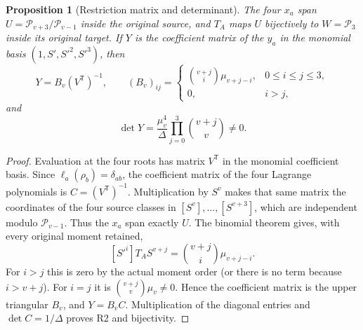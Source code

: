 \documentclass[11pt]{article}
\newtheorem{proposition}{Proposition}
\newcommand{\cP}{\mathcal P}
\begin{document}
\begin{proposition}[Restriction matrix and determinant]
The four $x_a$ span $U=\cP_{v+3}/\cP_{v-1}$ inside the original
source, and $T_A$ maps $U$ bijectively to $W=\cP_3$ inside its
original target. If $Y$ is the coefficient matrix of the $y_a$ in
the monomial basis $(1,S',S'^2,S'^3)$, then
\begin{equation}
 Y=B_v(V^{\mathsf T})^{-1},\qquad
 (B_v)_{ij}=\begin{cases}
 \binom{v+j}{i}\mu_{v+j-i},&0\le i\le j\le3,\\
 0,&i>j,
 \end{cases}\tag{R1}
\end{equation}
and
\begin{equation}
 \det Y=\frac{\mu_v^4}{\Delta}
             \prod_{j=0}^3\binom{v+j}{v}\ne0.\tag{R2}
\end{equation}
\end{proposition}
\begin{proof}
Evaluation at the four roots has matrix $V^{\mathsf T}$ in the
monomial coefficient basis. Since $\ell_a(\rho_b)=\delta_{ab}$,
the coefficient matrix of the four Lagrange polynomials is
$C=(V^{\mathsf T})^{-1}$. Multiplication by $S^v$ makes that same
matrix the coordinates of the four source classes in
$[S^v],\ldots,[S^{v+3}]$, which are independent modulo
$\cP_{v-1}$. Thus the $x_a$ span exactly $U$.
The binomial theorem gives, with every original moment retained,
\[
 [S'^i]T_A S^{v+j}=\binom{v+j}{i}\mu_{v+j-i}.
\]
For $i>j$ this is zero by the actual moment order (or there is no
term because $i>v+j$). For $i=j$ it is
$\binom{v+j}{v}\mu_v\ne0$. Hence the coefficient matrix is the
upper triangular $B_v$, and $Y=B_v C$. Multiplication of the
diagonal entries and $\det C=1/\Delta$ proves R2 and bijectivity.
\end{proof}
\end{document}
